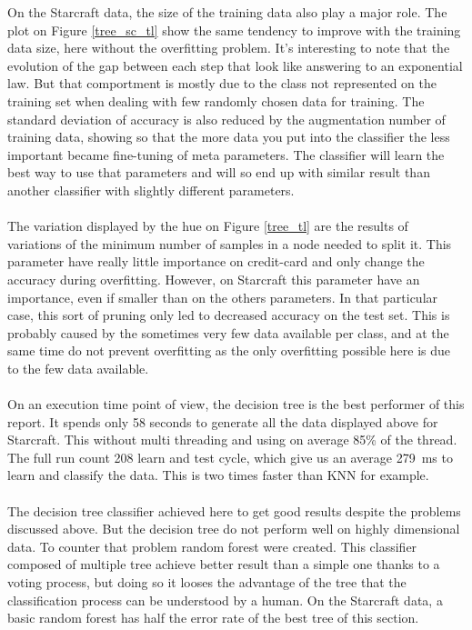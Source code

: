 \documentclass[twocolumn,a4paper,10pt]{article}
\begin{document}
On the Starcraft data, the size of the training data also play a major
role. The plot on Figure \ref{tree_sc_tl} show the same tendency
to improve with the training data size, here without the overfitting
problem. It's interesting to note that the evolution of the gap between
each step that look like answering to an exponential law. But that
comportment is mostly due to the class not represented on the training
set when dealing with few randomly chosen data for training. The standard
deviation of accuracy is also reduced by the augmentation number of
training data, showing so that the more data you put into the classifier
the less important became fine-tuning of meta parameters. The classifier
will learn the best way to use that parameters and will so end up
with similar result than another classifier with slightly different
parameters.

\paragraph{}
The variation displayed by the hue on Figure \ref{tree_tl} are the
results of variations of the minimum number of samples in a node needed to
split it. This parameter have really little importance on credit-card
and only change the accuracy during overfitting. However, on Starcraft
this parameter have an importance, even if smaller than on the others
parameters. In that particular case, this sort of pruning only led
to decreased accuracy on the test set. This is probably caused by
the sometimes very few data available per class, and at the same time
do not prevent overfitting as the only overfitting possible here is
due to the few data available.

\paragraph{}
On an execution time point of view, the decision tree is the best
performer of this report. It spends only 58 seconds to generate all
the data displayed above for Starcraft. This without multi threading
and using on average 85\% of the thread. The full run count 208 learn
and test cycle, which give us an average 279~ms to learn and classify
the data. This is two times faster than KNN for example.

\paragraph{}

The decision tree classifier achieved here to get good results despite
the problems discussed above. But the decision tree do not perform
well on highly dimensional data. To counter that problem random forest
were created. This classifier composed of multiple tree achieve better
result than a simple one thanks to a voting process, but doing so
it looses the advantage of the tree that the classification process
can be understood by a human. On the Starcraft data, a basic random
forest has half the error rate of the best tree of this section.
\end{document}
